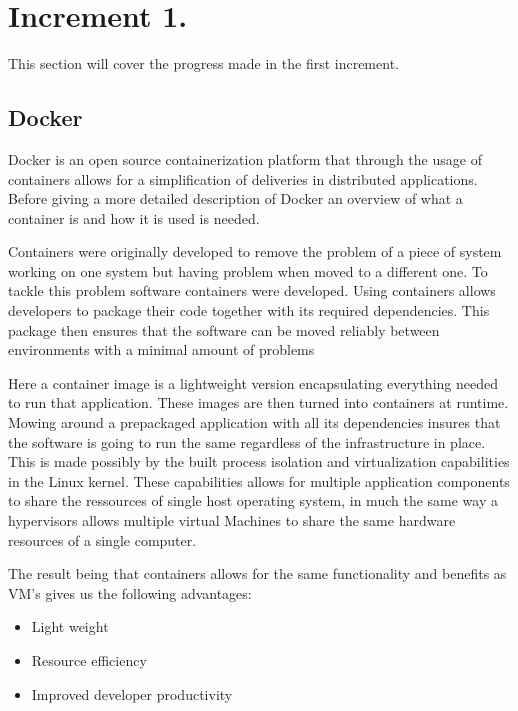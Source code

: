 \section{Increment 1.}
This section will cover the progress made in the first increment. 


\subsection{Docker}
Docker is an open source containerization platform that through the usage of containers allows for a simplification of deliveries in distributed applications. 
Before giving a more detailed description of Docker an overview of what a container is and how it is used is needed. 


Containers were originally developed to remove the problem of a piece of system working on one system but having problem when moved to a different one. 
To tackle this problem software containers were developed. 
Using containers allows developers to package their code together with its required dependencies. This package then ensures that the software can be moved reliably between environments with a minimal amount of problems


Here a container image is a lightweight version encapsulating everything needed to run that application. These images are then turned into containers at runtime. 
Mowing around a prepackaged application with all its dependencies insures that the software is going to run the same regardless of the infrastructure in place. 
This is made possibly by the built process isolation and virtualization capabilities in the Linux kernel. 
These capabilities allows for multiple application components to share the ressources of single host operating system, 
in much the same way a hypervisors allows multiple virtual Machines to share the same hardware resources of a single computer. 


The result being that containers allows for the same functionality and benefits as VM’s gives us the following advantages:

\begin{itemize}
    \item Light weight 
    \item Resource efficiency
    \item Improved developer productivity
\end{itemize}

